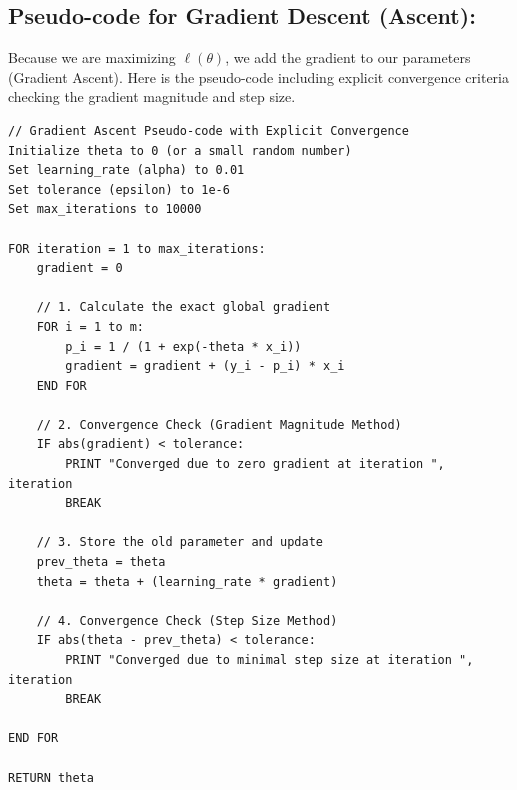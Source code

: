 \documentclass[twoside, 10pt]{article}
\begin{document}
\subsection{Pseudo-code for Gradient Descent (Ascent):}
Because we are maximizing $\ell(\theta)$, we add the gradient to our parameters (Gradient Ascent). Here is the pseudo-code including explicit convergence criteria checking the gradient magnitude and step size.
\begin{verbatim}
// Gradient Ascent Pseudo-code with Explicit Convergence
Initialize theta to 0 (or a small random number)
Set learning_rate (alpha) to 0.01
Set tolerance (epsilon) to 1e-6
Set max_iterations to 10000

FOR iteration = 1 to max_iterations:
    gradient = 0
    
    // 1. Calculate the exact global gradient
    FOR i = 1 to m:
        p_i = 1 / (1 + exp(-theta * x_i))
        gradient = gradient + (y_i - p_i) * x_i
    END FOR
    
    // 2. Convergence Check (Gradient Magnitude Method)
    IF abs(gradient) < tolerance:
        PRINT "Converged due to zero gradient at iteration ", iteration
        BREAK
    
    // 3. Store the old parameter and update
    prev_theta = theta
    theta = theta + (learning_rate * gradient)
    
    // 4. Convergence Check (Step Size Method)
    IF abs(theta - prev_theta) < tolerance:
        PRINT "Converged due to minimal step size at iteration ", iteration
        BREAK
        
END FOR

RETURN theta
\end{verbatim}
\end{document}
